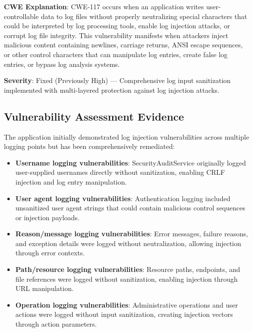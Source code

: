 \documentclass[]{UCD_CS_FYP_Report}
\begin{document}
\textbf{CWE Explanation}: CWE-117 occurs when an application writes user-controllable data to log files without properly neutralizing special characters that could be interpreted by log processing tools, enable log injection attacks, or corrupt log file integrity. This vulnerability manifests when attackers inject malicious content containing newlines, carriage returns, ANSI escape sequences, or other control characters that can manipulate log entries, create false log entries, or bypass log analysis systems.

\textbf{Severity}: Fixed (Previously High) — Comprehensive log input sanitization implemented with multi-layered protection against log injection attacks.

\subsection{Vulnerability Assessment Evidence}
The application initially demonstrated log injection vulnerabilities across multiple logging points but has been comprehensively remediated:
\begin{itemize}
	\item \textbf{Username logging vulnerabilities}: SecurityAuditService originally logged user-supplied usernames directly without sanitization, enabling CRLF injection and log entry manipulation.
	\item \textbf{User agent logging vulnerabilities}: Authentication logging included unsanitized user agent strings that could contain malicious control sequences or injection payloads.
	\item \textbf{Reason/message logging vulnerabilities}: Error messages, failure reasons, and exception details were logged without neutralization, allowing injection through error contexts.
	\item \textbf{Path/resource logging vulnerabilities}: Resource paths, endpoints, and file references were logged without sanitization, enabling injection through URL manipulation.
	\item \textbf{Operation logging vulnerabilities}: Administrative operations and user actions were logged without input sanitization, creating injection vectors through action parameters.
\end{itemize}
\end{document}
